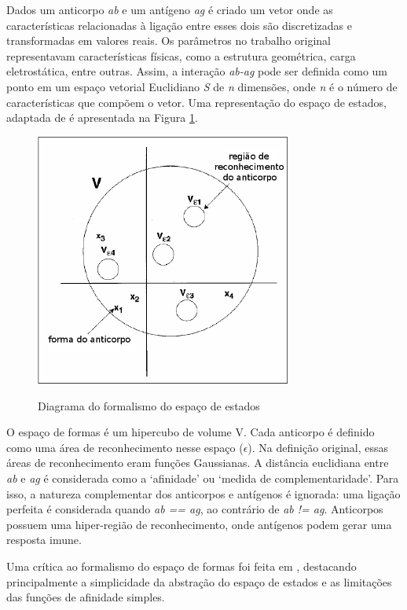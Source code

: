 Dados um anticorpo \emph{ab} e um antígeno \emph{ag} é criado um vetor onde as características relacionadas à ligação entre esses dois são discretizadas e transformadas em valores reais. Os parâmetros no trabalho original representavam características físicas, como a estrutura geométrica, carga eletrostática, entre outras. Assim, a interação \emph{ab-ag} pode ser definida como um ponto em um espaço vetorial Euclidiano \emph{S} de \emph{n} dimensões, onde \emph{n} é o número de características que compõem o vetor. Uma representação do espaço de estados, adaptada de \citet{Brownlee2007} é apresentada na Figura \ref{img:space}.

\begin{figure}[h!]
    \centering
    \includegraphics[width=0.75\textwidth]{img/space.png}
    \label{img:space}
    \caption{Diagrama do formalismo do espaço de estados \cite{Brownlee2007}}
\end{figure}

O espaço de formas é um hipercubo de volume V. Cada anticorpo é definido como uma área de reconhecimento nesse espaço ($\epsilon$). Na definição original, essas áreas de reconhecimento eram funções Gaussianas. A distância euclidiana entre \emph{ab} e \emph{ag} é considerada como a `afinidade' ou `medida de complementaridade'. Para isso, a natureza complementar dos anticorpos e antígenos é ignorada: uma ligação perfeita é considerada quando \emph{ab == ag}, ao contrário de \emph{ab != ag}. Anticorpos possuem uma hiper-região de reconhecimento, onde antígenos podem gerar uma resposta imune.

Uma crítica ao formalismo do espaço de formas foi feita em \citet{Carneiro1994}, destacando principalmente a simplicidade da abstração do espaço de estados e as limitações das funções de afinidade simples.

